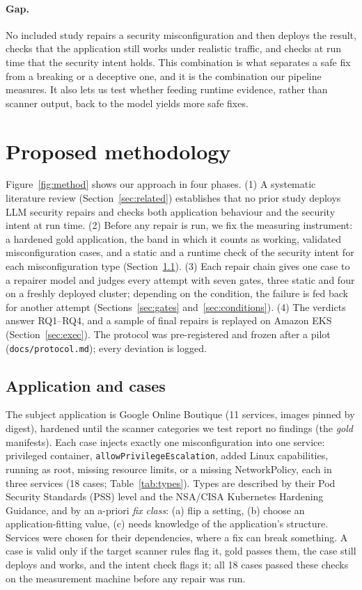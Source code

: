 \documentclass[10pt]{article}
\begin{document}
\paragraph{Gap.}
No included study repairs a security misconfiguration and then deploys the result, checks that the application still
works under realistic traffic, and checks at run time that the security intent holds. This combination is what
separates a safe fix from a breaking or a deceptive one, and it is the combination our pipeline measures. It also lets us
test whether feeding runtime evidence, rather than scanner output, back to the model yields more safe fixes.



\section{Proposed methodology}\label{sec:method}
Figure~\ref{fig:method} shows our approach in four phases. (1) A systematic literature review (Section~\ref{sec:related})
establishes that no prior study deploys LLM security repairs and checks both application behaviour and the security
intent at run time. (2) Before any repair is run, we fix the measuring instrument: a hardened gold application, the
band in which it counts as working, validated misconfiguration cases, and a static and a runtime check of the security
intent for each misconfiguration type (Section~\ref{sec:cases}). (3) Each repair chain gives one case to a repairer
model and judges every attempt with seven gates, three static and four on a freshly deployed cluster; depending on the
condition, the failure is fed back for another attempt (Sections~\ref{sec:gates} and~\ref{sec:conditions}). (4) The
verdicts answer RQ1--RQ4, and a sample of final repairs is replayed on Amazon EKS (Section~\ref{sec:exec}). The
protocol was pre-registered and frozen after a pilot (\texttt{docs/protocol.md}); every deviation is logged.



\subsection{Application and cases}\label{sec:cases}
The subject application is Google Online Boutique (11 services, images pinned by digest), hardened until the scanner
categories we test report no findings (the \emph{gold} manifests). Each case injects exactly one misconfiguration into
one service: privileged container, \texttt{allowPrivilegeEscalation}, added Linux capabilities, running as root,
missing resource limits, or a missing NetworkPolicy, each in three services (18 cases; Table~\ref{tab:types}). Types
are described by their Pod Security Standards (PSS) level and the NSA/CISA Kubernetes Hardening Guidance, and by an
a-priori \emph{fix class}: (a) flip a setting, (b) choose an application-fitting value, (c) needs knowledge of the
application's structure. Services were chosen for their dependencies, where a fix can break something. A case is valid
only if the target scanner rules flag it, gold passes them, the case still deploys and works, and the intent check flags
it; all 18 cases passed these checks on the measurement machine before any repair was run.
\end{document}
